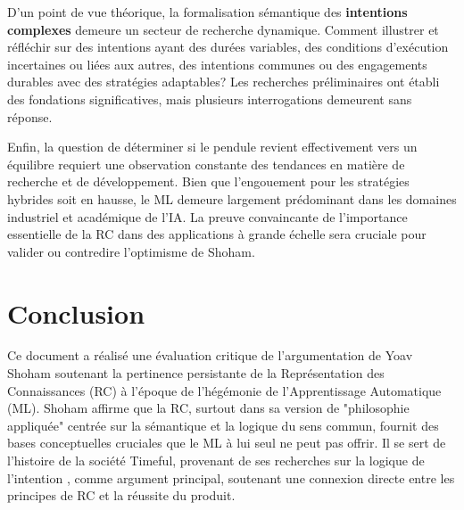\documentclass[11pt,a4paper]{article}
\begin{document}
D'un point de vue théorique, la formalisation sémantique des \textbf{intentions complexes} demeure un secteur de recherche dynamique. Comment illustrer et réfléchir sur des intentions ayant des durées variables, des conditions d'exécution incertaines ou liées aux autres, des intentions communes ou des engagements durables avec des stratégies adaptables? Les recherches préliminaires \citep{Cohen1990Intention, Bratman1991Intentions, Shoham2009Logics, Icard2023Joint} ont établi des fondations significatives, mais plusieurs interrogations demeurent sans réponse. 

Enfin, la question de déterminer si le pendule revient effectivement vers un équilibre \citep{Shoham2015Why} requiert une observation constante des tendances en matière de recherche et de développement. Bien que l'engouement pour les stratégies hybrides soit en hausse, le ML demeure largement prédominant dans les domaines industriel et académique de l'IA. La preuve convaincante de l'importance essentielle de la RC dans des applications à grande échelle sera cruciale pour valider ou contredire l'optimisme de Shoham. 

\section{Conclusion}
\label{sec:conclusion}
Ce document a réalisé une évaluation critique de l'argumentation de Yoav Shoham \citep{Shoham2015Why} soutenant la pertinence persistante de la Représentation des Connaissances (RC) à l'époque de l'hégémonie de l'Apprentissage Automatique (ML). Shoham affirme que la RC, surtout dans sa version de "philosophie appliquée" centrée sur la sémantique et la logique du sens commun, fournit des bases conceptuelles cruciales que le ML à lui seul ne peut pas offrir. Il se sert de l'histoire de la société Timeful, provenant de ses recherches sur la logique de l'intention \citep{Shoham2009Logics}, comme argument principal, soutenant une connexion directe entre les principes de RC et la réussite du produit. 
\end{document}
